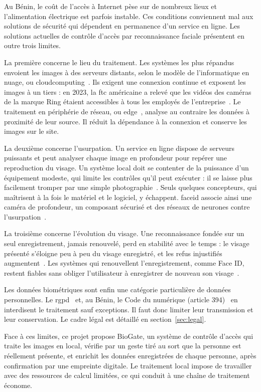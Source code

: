 \begin{maj}
Au Bénin, le coût de l'accès à Internet pèse sur de nombreux lieux et l'alimentation électrique est parfois instable. Ces conditions conviennent mal aux solutions de sécurité qui dépendent en permanence d'un service en ligne. Les solutions actuelles de contrôle d'accès par reconnaissance faciale présentent en outre trois limites.

La première concerne le lieu du traitement. Les systèmes les plus répandus envoient les images à des serveurs distants, selon le modèle de l'informatique en nuage, ou \gls{cloudcomputing}~\cite{nist800145}. Ils exigent une connexion continue et exposent les images à un tiers : en 2023, la \gls{ftc} américaine a relevé que les vidéos des caméras de la marque Ring étaient accessibles à tous les employés de l'entreprise~\cite{ftc2023ring}. Le traitement en périphérie de réseau, ou \gls{edge}~\cite{shi2016edge}, analyse au contraire les données à proximité de leur source. Il réduit la dépendance à la connexion et conserve les images sur le site.

La deuxième concerne l'usurpation. Un service en ligne dispose de serveurs puissants et peut analyser chaque image en profondeur pour repérer une reproduction du visage. Un système local doit se contenter de la puissance d'un équipement modeste, qui limite les contrôles qu'il peut exécuter : il se laisse plus facilement tromper par une simple photographie~\cite{chakraborty2014overview,iso30107}. Seuls quelques concepteurs, qui maîtrisent à la fois le matériel et le logiciel, y échappent. \gls{faceid} associe ainsi une caméra de profondeur, un composant sécurisé et des réseaux de neurones contre l'usurpation~\cite{apple2026faceid}.

La troisième concerne l'évolution du visage. Une reconnaissance fondée sur un seul enregistrement, jamais renouvelé, perd en stabilité avec le temps : le visage présenté s'éloigne peu à peu du visage enregistré, et les refus injustifiés augmentent~\cite{bestrowden2018longitudinal,deb2017aging}. Les systèmes qui renouvellent l'enregistrement, comme Face ID, restent fiables sans obliger l'utilisateur à enregistrer de nouveau son visage~\cite{apple2026faceid,pisani2019adaptive}.

Les données biométriques sont enfin une catégorie particulière de données personnelles. Le \gls{rgpd}~\cite{ue2016rgpd} et, au Bénin, le Code du numérique (article 394)~\cite{apdp2018codenumerique} en interdisent le traitement sauf exceptions. Il faut donc limiter leur transmission et leur conservation. Le cadre légal est détaillé en section~\ref{sec:legal}.

Face à ces limites, ce projet propose BioGate, un système de contrôle d'accès qui traite les images en local, vérifie par un geste tiré au sort que la personne est réellement présente, et enrichit les données enregistrées de chaque personne, après confirmation par une empreinte digitale. Le traitement local impose de travailler avec des ressources de calcul limitées, ce qui conduit à une chaîne de traitement économe.
\end{maj}

